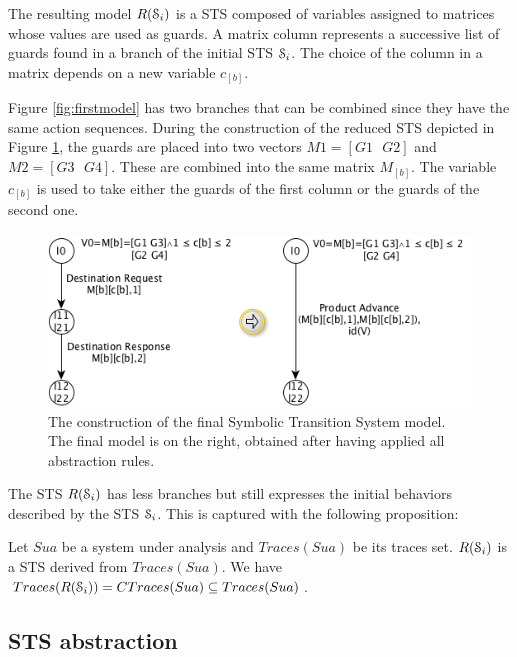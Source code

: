 The resulting model $R(\EuScript{S}_i)$ is a STS composed of
variables assigned to matrices whose values are used as guards. A
matrix column represents a successive list of guards found in a
branch of the initial STS $\EuScript{S}_i$. The choice of the
column in a matrix depends on a new variable $c_{[b]}$.

Figure \ref{fig:firstmodel} has two branches that can be combined
since they have the same action sequences. During the
construction of the reduced STS depicted in Figure
\ref{fig:finalmodel}, the guards are placed into two vectors
$M1=[G1\text{ }G2]$ and $M2=[G3\text{ }G4]$.  These are combined
into the same matrix $M_{[b]}$. The variable $c_{[b]}$ is used to
take either the guards of the first column or the guards of the
second one.

\begin{figure}[ht]
  \includegraphics[width=1.0\linewidth]{figures/STSfinal.png}

    \caption{The construction of the final Symbolic Transition
    System model. The final model is on the right, obtained after
    having applied all abstraction rules.}
	\label{fig:finalmodel}
\end{figure}

The STS $R(\EuScript{S}_i)$ has less branches but still expresses
the initial behaviors described by the STS $\EuScript{S}_i$.
This is captured with the following proposition:

\begin{proposition}
  Let $\mathit{Sua}$ be a system under analysis and $Traces(Sua)$ be its traces
  set. $R(\EuScript{S}_i)$ is a STS derived from $Traces(Sua)$.
  We have $Traces(R(\EuScript{S}_i)) = CTraces(Sua) \subseteq Traces(Sua)$.
\end{proposition}


\subsection{STS abstraction}

